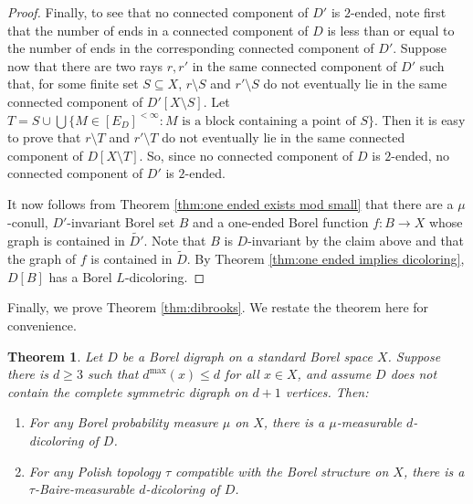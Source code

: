 \documentclass[psamsfonts]{amsart}
\newtheorem{thm}{Theorem}[section]
\theoremstyle{definition}
\theoremstyle{remark}
\numberwithin{equation}{section}
\begin{document}
\begin{proof}
    Finally, to see that no connected component of $D'$ is $2$-ended, note first that the number of ends in a connected component of $D$ is less than or equal to the number of ends in the corresponding connected component of $D'$. Suppose now that there are two rays $r, r'$ in the same connected component of $D'$ such that, for some finite set $S \subseteq X$, $r \setminus S$ and $r' \setminus S$ do not eventually lie in the same connected component of $D'[X \setminus S]$. Let $T = S \cup \bigcup\{M \in [E_D]^{<\infty} : M \text{ is a block containing a point of $S$}\}$. Then it is easy to prove that $r \setminus T$ and $r' \setminus T$ do not eventually lie in the same connected component of $D[X \setminus T]$. So, since no connected component of $D$ is $2$-ended, no connected component of $D'$ is $2$-ended.

    It now follows from Theorem \ref{thm:one ended exists mod small} that there are a $\mu$-conull, $D'$-invariant Borel set $B$ and a one-ended Borel function $f : B \rightarrow X$ whose graph is contained in $\widetilde{D'}$. Note that $B$ is $D$-invariant by the claim above and that the graph of $f$ is contained in $\tilde{D}$. By Theorem \ref{thm:one ended implies dicoloring}, $D[B]$ has a Borel $L$-dicoloring.
\end{proof}

Finally, we prove Theorem \ref{thm:dibrooks}. We restate the theorem here for convenience.

\begin{thm}
    Let $D$ be a Borel digraph on a standard Borel space $X$. Suppose there is $d \geq 3$ such that $d^{\max}(x) \leq d$ for all $x \in X$, and assume $D$ does not contain the complete symmetric digraph on $d + 1$ vertices. Then:
    \begin{enumerate}
        \item For any Borel probability measure $\mu$ on $X$, there is a $\mu$-measurable $d$-dicoloring of $D$.
        \item For any Polish topology $\tau$ compatible with the Borel structure on $X$, there is a $\tau$-Baire-measurable $d$-dicoloring of $D$.
    \end{enumerate}
\end{thm}
\end{document}
